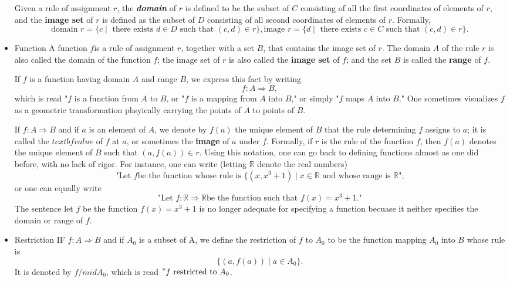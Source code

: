 \documentclass[a4paper]{report}
\begin{document}
\begin{itemize}
		Given a rule of assignment $r$, the \textit{\textbf{domain}} of $r$ is defined to be the subset of $C$ consisting of all the first coordinates of elements of $r$, and the \textbf{image set} of $r$ is defined as the subset of $D$ consisting of all second coordinates of elements of $r$. Formally, 
		\[
			\text{domain } r = \{c \mid \text{ there exists } d \in D \text{ such that } (c, d) \in r \}, 
			 \text{image } r = \{d \mid \text{ there exists } c \in C \text{ such that } (c, d) \in r \}.
		\]
\item Function
	A function $f$is a rule of assignment $r$, together with a set $B$, that contains the image set of $r$. The domain $A$ of the rule $r$ is also called the domain of the function $f$; the image set of $r$ is also called the \textbf{image set} of $f$; and the set $B$ is called the \textbf{range} of $f$. 

	If $f$ is a function having domain $A$ and range $B$, we express this fact by writing 
	\[
		f: A \Longrightarrow B,
	\]
	which is read "$f$ is a function from $A$ to $B$, or "$f$ is a mapping from $A$ into $B$," or simply "$f$ maps $A$ into $B$." One sometimes visualizes $f$ as a geometric transformation phsyically carrying the points of $A$ to points of $B$. 

	If $f: A \Longrightarrow B$ and if $a$ is an element of $A$, we denote by $f(a)$ the unique element of $B$ that the rule determining $f$ assigns to $a$; it is called the $textbf{value}$ of $f$ at $a$, or sometimes the \textbf{image} of $a$ under $f$. Formally, if $r$ is the rule of the function $f$, then $f(a)$ denotes the unique element of $B$ such that $(a, f(a)) \in r$. 
		Using this notation, one can go back to defining functions almost as one did before, with no lack of rigor. For instance, one can write (letting $\mathbb{R}$ denote the real numbers)
		\[
			\text{"Let } f \text{be the function whose rule is } \{(x, x^3 + 1) \mid x \in \mathbb{R} \text{ and whose range is } \mathbb{R}\text{",}
		\]
	or one can equally write
		\[ 
			\text{"Let } f : \mathbb{R} \Rightarrow \mathbb{R} \text{be the function such that } f(x) = x^3 + 1\text{."}
		\]
	The sentence let $f$ be the function $f(x) = x^3 +1$ is no longer adequate for specifying a function becuase it neither specifies the domain or range of $f$. 
	
\item Restriction
		IF $f : A \Rightarrow B$ and if $A_{0}$ is a subset of A, we define the restriction of $f$ to $A_{0}$ to be the function mapping $A_{0}$ into $B$ whose rule is 
		\[
			\{(a, f(a)) \mid a \in A_{0}\}. 
		\]
	It is denoted by $f/mid A_{0}$, which is read $"f \text{ restricted to } A_{0}$. 
	

\end{itemize}
\end{document}
